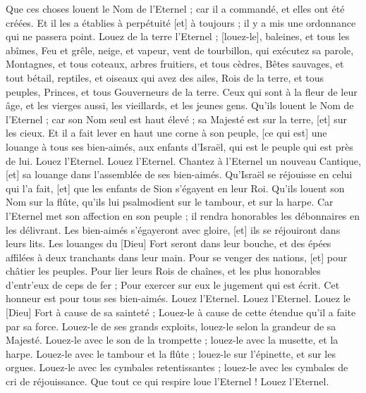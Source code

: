 \begin{multicols}{2}
Que ces choses louent le Nom de l’Eternel ; car il a commandé, et elles ont été créées.
Et il les a établies à perpétuité [et] à toujours ; il y a mis une ordonnance qui ne passera point.
Louez de la terre l'Eternel ; [louez-le], baleines, et tous les abîmes,
Feu et grêle, neige, et vapeur, vent de tourbillon, qui exécutez sa parole,
Montagnes, et tous coteaux, arbres fruitiers, et tous cèdres,
Bêtes sauvages, et tout bétail, reptiles, et oiseaux qui avez des ailes,
Rois de la terre, et tous peuples, Princes, et tous Gouverneurs de la terre.
Ceux qui sont à la fleur de leur âge, et les vierges aussi, les vieillards, et les jeunes gens.
Qu'ils louent le Nom de l’Eternel ; car son Nom seul est haut élevé ; sa Majesté est sur la terre, [et] sur les cieux.
Et il a fait lever en haut une corne à son peuple, [ce qui est] une louange à tous ses bien-aimés, aux enfants d'Israël, qui est le peuple qui est près de lui. Louez l'Eternel.
\VerseOne{}Louez l'Eternel. Chantez à l'Eternel un nouveau Cantique, [et] sa louange dans l'assemblée de ses bien-aimés.
Qu'Israël se réjouisse en celui qui l'a fait, [et] que les enfants de Sion s'égayent en leur Roi.
Qu'ils louent son Nom sur la flûte, qu'ils lui psalmodient sur le tambour, et sur la harpe.
Car l'Eternel met son affection en son peuple ; il rendra honorables les débonnaires en les délivrant.
Les bien-aimés s'égayeront avec gloire, [et] ils se réjouiront dans leurs lits.
Les louanges du [Dieu] Fort seront dans leur bouche, et des épées affilées à deux tranchants dans leur main.
Pour se venger des nations, [et] pour châtier les peuples.
Pour lier leurs Rois de chaînes, et les plus honorables d'entr’eux de ceps de fer ;
Pour exercer sur eux le jugement qui est écrit. Cet honneur est pour tous ses bien-aimés. Louez l'Eternel.
\VerseOne{}Louez l'Eternel. Louez le [Dieu] Fort à cause de sa sainteté ; Louez-le à cause de cette étendue qu'il a faite par sa force.
Louez-le de ses grands exploits, louez-le selon la grandeur de sa Majesté.
Louez-le avec le son de la trompette ; louez-le avec la musette, et la harpe.
Louez-le avec le tambour et la flûte ; louez-le sur l’épinette, et sur les orgues.
Louez-le avec les cymbales retentissantes ; louez-le avec les cymbales de cri de réjouissance.
Que tout ce qui respire loue l'Eternel ! Louez l'Eternel.
\PPE{}
\end{multicols}
